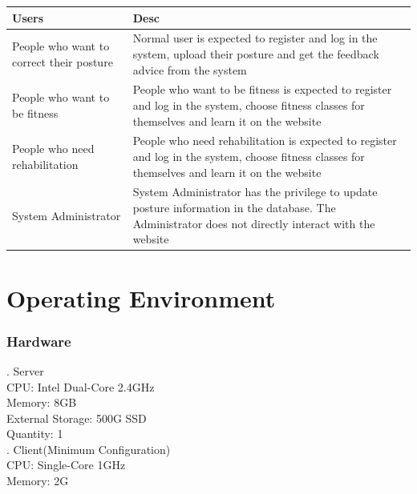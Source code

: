 \documentclass[16pt]{scrreprt}
\begin{document}
 
\begin{center}
    \begin{tabular}{p{5cm}p{11cm}}
        \hline
	    Users & Desc\\
        \hline
	    People who want to correct their posture &  Normal user is expected to register and log in the system, upload their posture and get the feedback advice from the system\\
        \hline
	    People who want to be fitness & People who want to be fitness is expected to register and log in the system, choose fitness classes for themselves and learn it on the website\\
        \hline
        People who need rehabilitation & People who need rehabilitation is expected to register and log in the system, choose fitness classes for themselves and learn it on the website\\
        \hline
        System Administrator & System Administrator has the privilege to update posture information in the database. The Administrator does not directly interact with the website\\
        \hline
    \end{tabular}
\end{center}

 
\section{Operating Environment}

 
\subsubsection{Hardware}

 
. Server\\

 
CPU: Intel Dual-Core 2.4GHz\\

 
Memory: 8GB\\

 
External Storage: 500G SSD\\

 
Quantity: 1\\

 
. Client(Minimum Configuration)\\

 
CPU: Single-Core 1GHz\\

 
Memory: 2G\\
\end{document}

